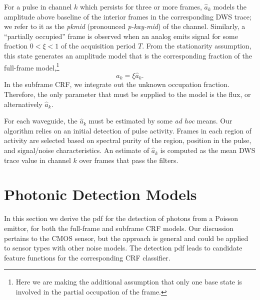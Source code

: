 \documentclass[10pt]{article}
\newcommand{\dws}{{\small DWS}}
\newcommand{\crf}{{\small CRF}}
\newcommand{\cmos}{{\small CMOS}}
\begin{document}
For a pulse in channel $k$ which persists for three or more frames, $\hat{a}_k$ models the amplitude above baseline of the interior frames in the corresponding \dws{} trace; we refer to it as the \emph{pkmid} (pronounced \emph{p-kay-mid}) of the channel.  
Similarly, a ``partially occupied'' frame is observed when an analog emits signal for some fraction $0 < \xi < 1$ of the acquisition period $T$.
From the stationarity assumption, this state generates an amplitude model that is the corresponding fraction of the full-frame model,\footnote{
	Here we are making the additional assumption that only one base state is involved in the partial occupation of the frame.}
\begin{equation}
\label{eq:partial_amplitude_model}
a_k = \xi \hat{a}_k.
\end{equation}
In the subframe \crf{}, we integrate out the unknown occupation fraction.
Therefore, the only parameter that must be supplied to the model is the flux, or alternatively $\hat{a}_k$. 

For each waveguide, the $\hat{a}_k$ must be estimated by some \emph{ad hoc} means.  Our algorithm relies on an initial detection of pulse activity.  Frames in each region of activity are selected based on spectral purity of the region, position in the pulse, and signal/noise characteristics.  An estimate of $\hat{a}_k$ is computed as the mean \dws{} trace value in channel $k$ over frames that pass the filters.

\section{Photonic Detection Models}
\label{sec:photonics}
In this section we derive the pdf for the detection of photons from a Poisson emittor, for both the full-frame and subframe \crf{} models.  Our  discussion pertains to the \cmos{} sensor, but the approach is general and could be applied to sensor types with other noise models. The detection pdf leads to candidate feature functions for the corresponding \crf{} classifier.

\end{document}
